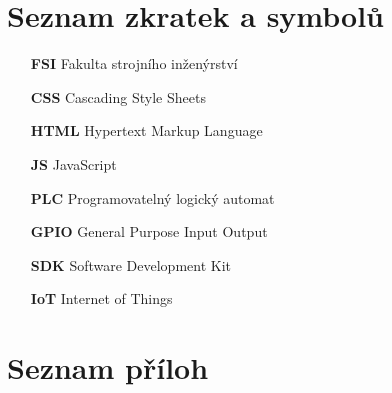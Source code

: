 \chapter*{Seznam zkratek a symbolů}
\label{chap:loa}
\begin{itemize}
    \item[\textbf{FSI}] Fakulta strojního inženýrství

    \item[\textbf{CSS}] Cascading Style Sheets

    \item[\textbf{HTML}] Hypertext Markup Language

    \item[\textbf{JS}] JavaScript

    \item[\textbf{PLC}] Programovatelný logický automat

    \item[\textbf{GPIO}] General Purpose Input Output

    \item[\textbf{SDK}] Software Development Kit

    \item[\textbf{IoT}] Internet of Things
\end{itemize}

\printbibliography[heading=bibintoc,title={Seznam zdrojů}]

\listoffigures

\listoftables

\chapter*{Seznam příloh}
